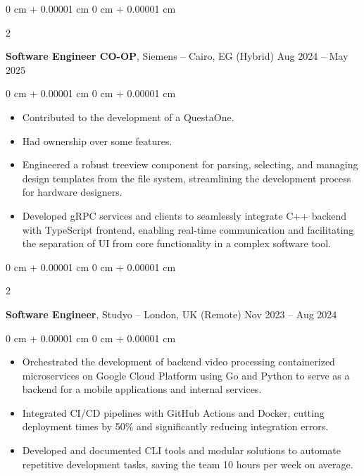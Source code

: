 \documentclass[10pt, letterpaper]{article}
\newenvironment{highlights}{
    \begin{itemize}[
        topsep=0.10 cm,
        parsep=0.10 cm,
        partopsep=0pt,
        itemsep=0pt,
        leftmargin=0 cm + 10pt
    ]
}{
    \end{itemize}
} %
\newenvironment{onecolentry}{
    \begin{adjustwidth}{
        0 cm + 0.00001 cm
    }{
        0 cm + 0.00001 cm
    }
}{
    \end{adjustwidth}
} %
\newenvironment{twocolentry}[2][]{
    \onecolentry
    \def\secondColumn{#2}
    \setcolumnwidth{\fill, 4.5 cm}
    \begin{paracol}{2}
}{
    \switchcolumn \raggedleft \secondColumn
    \end{paracol}
    \endonecolentry
} %
\begin{document}
\vspace{0.4 cm}

\begin{twocolentry}{
        Aug 2024 – May 2025
    }
    \textbf{Software Engineer CO-OP}, Siemens -- Cairo, EG (Hybrid)\end{twocolentry}

\vspace{0.10 cm}
\begin{onecolentry}
    \begin{highlights}
        \item Contributed to the development of a QuestaOne.
        \item Had ownership over some features.
        \item Engineered a robust treeview component for parsing, selecting, and managing design templates from the file system, streamlining the development process for hardware designers.
        \item Developed gRPC services and clients to seamlessly integrate C++ backend with TypeScript frontend, enabling real-time communication and facilitating the separation of UI from core functionality in a complex software tool.

    \end{highlights}
\end{onecolentry}


\vspace{0.4 cm}

\begin{twocolentry}{
        Nov 2023 – Aug 2024
    }
    \textbf{Software Engineer}, Studyo -- London, UK (Remote)\end{twocolentry}

\vspace{0.10 cm}
\begin{onecolentry}
    \begin{highlights}
        \item Orchestrated the development of backend video processing containerized microservices on Google Cloud Platform using Go and Python to serve as a backend for a mobile applications and internal services.
        \item Integrated CI/CD pipelines with GitHub Actions and Docker, cutting deployment times by 50\% and significantly reducing integration errors.
        \item Developed and documented CLI tools and modular solutions to automate repetitive development tasks, saving the team 10 hours per week on average.
    \end{highlights}
\end{onecolentry}
\end{document}
